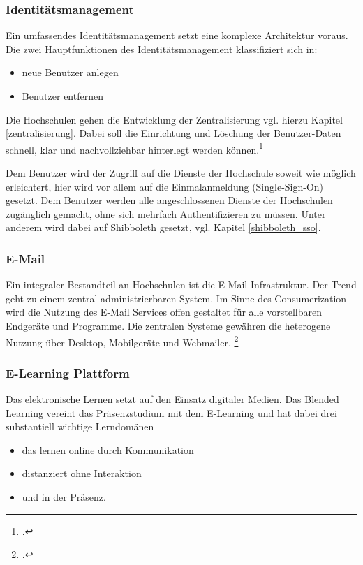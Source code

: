\subsubsection{Identitätsmanagement}
\label{subsubsection_identitatsmanagement}
Ein umfassendes Identitätsmanagement setzt eine komplexe Architektur voraus. Die zwei Hauptfunktionen des Identitätsmanagement klassifiziert sich in:

\begin{itemize}
	\item neue Benutzer anlegen
	\item Benutzer entfernen
\end{itemize}

Die Hochschulen gehen die Entwicklung der Zentralisierung vgl. hierzu Kapitel 
\ref{zentralisierung}. Dabei soll die Einrichtung und Löschung der Benutzer-Daten schnell, klar 
und nachvollziehbar hinterlegt werden 
können.\footcite{harnisch_identitat_2008}

Dem Benutzer wird der Zugriff auf die Dienste der Hochschule soweit wie möglich erleichtert, hier wird vor allem auf die Einmalanmeldung (Single-Sign-On) gesetzt. Dem Benutzer werden alle angeschlossenen Dienste der Hochschulen zugänglich gemacht, ohne sich mehrfach Authentifizieren zu müssen. Unter anderem wird dabei auf Shibboleth gesetzt, vgl. Kapitel \ref{shibboleth_sso}.


\subsubsection{E-Mail}
Ein integraler Bestandteil an Hochschulen ist die E-Mail Infrastruktur. Der Trend geht zu einem zentral-administrierbaren System. Im Sinne des Consumerization wird die Nutzung des E-Mail Services offen gestaltet für alle vorstellbaren Endgeräte und Programme. Die zentralen Systeme gewähren die heterogene Nutzung über Desktop, Mobilgeräte und Webmailer. \footcite{hszwickau_zahlen_2015}


\subsubsection{E-Learning Plattform}
\label{subsubsection_e_learning_plattformen}
Das elektronische Lernen setzt auf den Einsatz digitaler Medien. Das Blended Learning vereint das Präsenzstudium mit dem E-Learning und hat dabei drei substantiell wichtige Lerndomänen

\begin{itemize}
	\item das lernen online durch Kommunikation
	\item distanziert ohne Interaktion
	\item und in der Präsenz.
\end{itemize}

